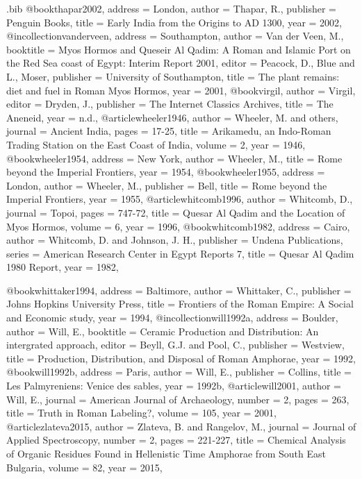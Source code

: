 \begin{filecontents}{\IJSRAidentifier.bib}
@book{thapar2002,
	address = {London},
	author = {Thapar, R.},
	publisher = {Penguin Books},
	title = {Early India from the Origins to AD 1300},
	year = {2002},
}
@incollection{vanderveen,
	address = {Southampton},
	author = {Van der Veen, M.},
	booktitle = {Myos Hormos and Queseir Al Qadim: A Roman and Islamic Port on the Red Sea coast of Egypt: Interim Report 2001},
	editor = {Peacock, D., Blue and L., Moser},
	publisher = {University of Southampton},
	title = {The plant remains: diet and fuel in Roman Myos Hormos},
	year = {2001},
}%
@book{virgil,
	author = {Virgil},
	editor = {Dryden, J.},
	publisher = {The Internet Classics Archives},
	title = {The Aneneid},
	year = {n.d.},
}
@article{wheeler1946,
	author = {Wheeler, M. and others},
	journal = {Ancient India},
	pages = {17-25},
	title = {Arikamedu, an Indo-Roman Trading Station on the East Coast of India},
	volume = {2},
	year = {1946},
}
@book{wheeler1954,
	address = {New York},
	author = {Wheeler, M.},
	title = {Rome beyond the Imperial Frontiers},
	year = {1954},
}
@book{wheeler1955,
	address = {London},
	author = {Wheeler, M.},
	publisher = {Bell},
	title = {Rome beyond the Imperial Frontiers},
	year = {1955},
}
@article{whitcomb1996,
	author = {Whitcomb, D.},
	journal = {Topoi},
	pages = {747-72},
	title = {Quesar Al Qadim and the Location of Myos Hormos},
	volume = {6},
	year = {1996},
}
@book{whitcomb1982,
	address = {Cairo},
	author = {Whitcomb, D. and Johnson, J. H.},
	publisher = {Undena Publications},
	series = {American Research Center in Egypt Reports 7},
	title = {Quesar Al Qadim 1980 Report},
	year = {1982},
}

@book{whittaker1994,
	address = {Baltimore},
	author = {Whittaker, C.},
	publisher = {Johns Hopkins University Press},
	title = {Frontiers of the Roman Empire: A Social and Economic study},
	year = {1994},
}
@incollection{will1992a,
	address = {Boulder},
	author = {Will, E.},
	booktitle = {Ceramic Production and Distribution: An intergrated approach},
	editor = {Beyll, G.J. and Pool, C.},
	publisher = {Westview},
	title = {Production, Distribution, and Disposal of Roman Amphorae},
	year = {1992},
}
@book{will1992b,
	address = {Paris},
	author = {Will, E.},
	publisher = {Collins},
	title = {Les Palmyreniens: Venice des sables},
	year = {1992b},
}
@article{will2001,
	author = {Will, E.},
	journal = {American Journal of Archaeology},
	number = {2},
	pages = {263},
	title = {Truth in Roman Labeling?},
	volume = {105},
	year = {2001},
}
@article{zlateva2015,
	author = {Zlateva, B. and Rangelov, M.},
	journal = {Journal of Applied Spectroscopy},
	number = {2},
	pages = {221-227},
	title = {Chemical Analysis of Organic Residues Found in Hellenistic Time Amphorae from South East Bulgaria},
	volume = {82},
	year = {2015},
}

\end{filecontents}
\IJSRAopening%

